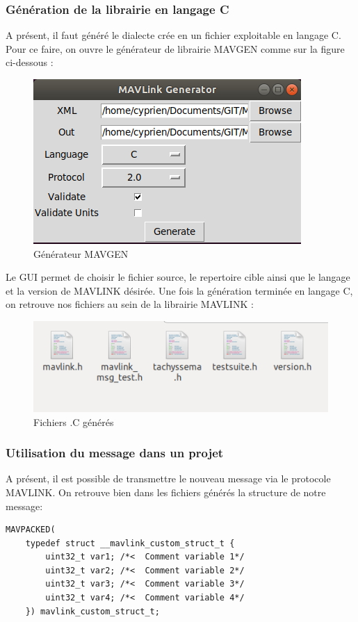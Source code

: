  \subsubsection{Génération de la librairie en langage C }
 A présent, il faut généré le dialecte crée en un fichier exploitable en langage C. Pour ce faire, on ouvre le générateur de librairie MAVGEN comme sur la figure ci-dessous : 
\begin{figure}[ht]
	\centering
    \includegraphics[scale=0.75]{img/mavgen.png}
    \caption{Générateur MAVGEN}
    \label{fig:mavgen}
\end{figure}
Le GUI permet de choisir le fichier source, le repertoire cible ainsi que le langage et la version de MAVLINK désirée. 
Une fois la génération terminée en langage C, on retrouve nos fichiers au sein de la librairie MAVLINK : 
\begin{figure}[ht]
	\centering
    \includegraphics[scale=0.5]{img/fichiersC.png}
    \caption{Fichiers .C générés }
    \label{fig:mavgen}
\end{figure}
\subsubsection{Utilisation du message dans un projet}
A présent, il est possible de  transmettre le nouveau message via le protocole MAVLINK. On retrouve bien dans les fichiers générés la structure de notre message: 
\lstset{style=C_Style}
\begin{lstlisting}[caption={Structure personnalisée},captionpos=b, label={lst:custom_struct __mavlink_message_test_t}]
MAVPACKED(
	typedef struct __mavlink_custom_struct_t {
		uint32_t var1; /*<  Comment variable 1*/
		uint32_t var2; /*<  Comment variable 2*/
		uint32_t var3; /*<  Comment variable 3*/
		uint32_t var4; /*<  Comment variable 4*/
	}) mavlink_custom_struct_t;
\end{lstlisting}


